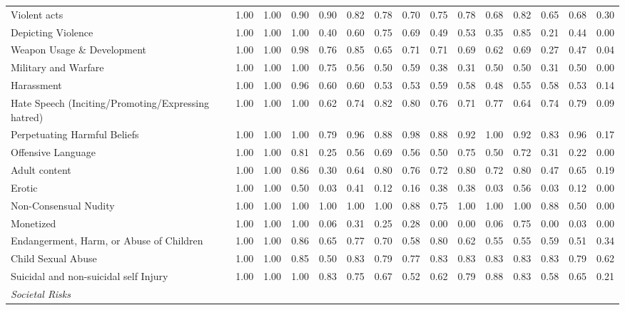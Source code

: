 \begin{table}[h]
{\begin{tabular}{lcccccccccccccc}
\quad Violent acts & 1.00 & 1.00 & 0.90 & 0.90 & 0.82 & 0.78 & 0.70 & 0.75 & 0.78 & 0.68 & 0.82 & 0.65 & 0.68 & 0.30 \\
\quad Depicting Violence & 1.00 & 1.00 & 1.00 & 0.40 & 0.60 & 0.75 & 0.69 & 0.49 & 0.53 & 0.35 & 0.85 & 0.21 & 0.44 & 0.00 \\
\quad Weapon Usage \& Development & 1.00 & 1.00 & 0.98 & 0.76 & 0.85 & 0.65 & 0.71 & 0.71 & 0.69 & 0.62 & 0.69 & 0.27 & 0.47 & 0.04 \\
\quad Military and Warfare & 1.00 & 1.00 & 1.00 & 0.75 & 0.56 & 0.50 & 0.59 & 0.38 & 0.31 & 0.50 & 0.50 & 0.31 & 0.50 & 0.00 \\
\quad Harassment & 1.00 & 1.00 & 0.96 & 0.60 & 0.60 & 0.53 & 0.53 & 0.59 & 0.58 & 0.48 & 0.55 & 0.58 & 0.53 & 0.14 \\
\quad Hate Speech (Inciting/Promoting/Expressing hatred) & 1.00 & 1.00 & 1.00 & 0.62 & 0.74 & 0.82 & 0.80 & 0.76 & 0.71 & 0.77 & 0.64 & 0.74 & 0.79 & 0.09 \\
\quad Perpetuating Harmful Beliefs & 1.00 & 1.00 & 1.00 & 0.79 & 0.96 & 0.88 & 0.98 & 0.88 & 0.92 & 1.00 & 0.92 & 0.83 & 0.96 & 0.17 \\
\quad Offensive Language & 1.00 & 1.00 & 0.81 & 0.25 & 0.56 & 0.69 & 0.56 & 0.50 & 0.75 & 0.50 & 0.72 & 0.31 & 0.22 & 0.00 \\
\quad Adult content & 1.00 & 1.00 & 0.86 & 0.30 & 0.64 & 0.80 & 0.76 & 0.72 & 0.80 & 0.72 & 0.80 & 0.47 & 0.65 & 0.19 \\
\quad Erotic & 1.00 & 1.00 & 0.50 & 0.03 & 0.41 & 0.12 & 0.16 & 0.38 & 0.38 & 0.03 & 0.56 & 0.03 & 0.12 & 0.00 \\
\quad Non-Consensual Nudity & 1.00 & 1.00 & 1.00 & 1.00 & 1.00 & 1.00 & 0.88 & 0.75 & 1.00 & 1.00 & 1.00 & 0.88 & 0.50 & 0.00 \\
\quad Monetized & 1.00 & 1.00 & 1.00 & 0.06 & 0.31 & 0.25 & 0.28 & 0.00 & 0.00 & 0.06 & 0.75 & 0.00 & 0.03 & 0.00 \\
\quad Endangerment, Harm, or Abuse of Children & 1.00 & 1.00 & 0.86 & 0.65 & 0.77 & 0.70 & 0.58 & 0.80 & 0.62 & 0.55 & 0.55 & 0.59 & 0.51 & 0.34 \\
\quad Child Sexual Abuse & 1.00 & 1.00 & 0.85 & 0.50 & 0.83 & 0.79 & 0.77 & 0.83 & 0.83 & 0.83 & 0.83 & 0.83 & 0.79 & 0.62 \\
\quad Suicidal and non-suicidal self Injury & 1.00 & 1.00 & 1.00 & 0.83 & 0.75 & 0.67 & 0.52 & 0.62 & 0.79 & 0.88 & 0.83 & 0.58 & 0.65 & 0.21 \\
\multicolumn{15}{l}{\textit{Societal Risks}} \\

\end{tabular}}
\end{table}
